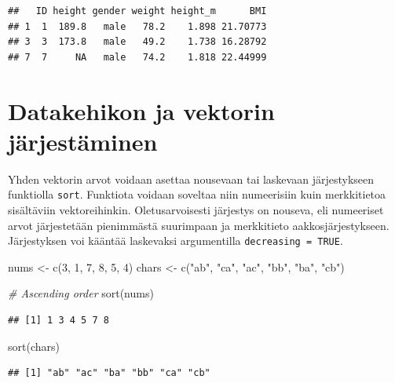 \documentclass[
]{book}
\newenvironment{Shaded}{\begin{snugshade}}{\end{snugshade}}
\newcommand{\CommentTok}[1]{\textcolor[rgb]{0.56,0.35,0.01}{\textit{#1}}}
\newcommand{\DecValTok}[1]{\textcolor[rgb]{0.00,0.00,0.81}{#1}}
\newcommand{\FunctionTok}[1]{\textcolor[rgb]{0.00,0.00,0.00}{#1}}
\newcommand{\NormalTok}[1]{#1}
\newcommand{\OtherTok}[1]{\textcolor[rgb]{0.56,0.35,0.01}{#1}}
\newcommand{\StringTok}[1]{\textcolor[rgb]{0.31,0.60,0.02}{#1}}
\begin{document}
\begin{verbatim}
##   ID height gender weight height_m      BMI
## 1  1  189.8   male   78.2    1.898 21.70773
## 3  3  173.8   male   49.2    1.738 16.28792
## 7  7     NA   male   74.2    1.818 22.44999
\end{verbatim}

\hypertarget{datakehikon-ja-vektorin-juxe4rjestuxe4minen}{%
\section{Datakehikon ja vektorin järjestäminen}\label{datakehikon-ja-vektorin-juxe4rjestuxe4minen}}

Yhden vektorin arvot voidaan asettaa nousevaan tai laskevaan järjestykseen funktiolla \texttt{sort}. Funktiota voidaan soveltaa niin numeerisiin kuin merkkitietoa sisältäviin vektoreihinkin. Oletusarvoisesti järjestys on nouseva, eli numeeriset arvot järjestetään pienimmästä suurimpaan ja merkkitieto aakkosjärjestykseen. Järjestyksen voi kääntää laskevaksi argumentilla \texttt{decreasing\ =\ TRUE}.

\begin{Shaded}
\begin{Highlighting}[]
\NormalTok{nums }\OtherTok{\textless{}{-}} \FunctionTok{c}\NormalTok{(}\DecValTok{3}\NormalTok{, }\DecValTok{1}\NormalTok{, }\DecValTok{7}\NormalTok{, }\DecValTok{8}\NormalTok{, }\DecValTok{5}\NormalTok{, }\DecValTok{4}\NormalTok{)}
\NormalTok{chars }\OtherTok{\textless{}{-}} \FunctionTok{c}\NormalTok{(}\StringTok{"ab"}\NormalTok{, }\StringTok{"ca"}\NormalTok{, }\StringTok{"ac"}\NormalTok{, }\StringTok{"bb"}\NormalTok{, }\StringTok{"ba"}\NormalTok{, }\StringTok{"cb"}\NormalTok{)}

\CommentTok{\# Ascending order}
\FunctionTok{sort}\NormalTok{(nums)}
\end{Highlighting}
\end{Shaded}

\begin{verbatim}
## [1] 1 3 4 5 7 8
\end{verbatim}

\begin{Shaded}
\begin{Highlighting}[]
\FunctionTok{sort}\NormalTok{(chars)}
\end{Highlighting}
\end{Shaded}

\begin{verbatim}
## [1] "ab" "ac" "ba" "bb" "ca" "cb"
\end{verbatim}
\end{document}
